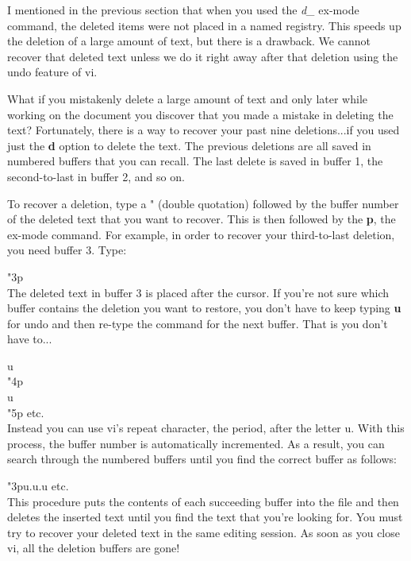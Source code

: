 I mentioned in the previous section that when you used the \emph{d\_} ex-mode command, the deleted items were not placed in a named registry. This speeds up the deletion of a large amount of text, but there is a drawback. We cannot recover that deleted text unless we do it right away after that deletion using the undo feature of vi.

What if you mistakenly delete a large amount of text and only later while working on the document you discover that you made a mistake in deleting the text? Fortunately, there is a way to recover your past nine deletions...if you used just the \textbf{d} option to delete the text. The previous deletions are all saved in numbered buffers that you can recall. The last delete is saved in buffer 1, the second-to-last in buffer 2, and so on.

To recover a deletion, type a " (double quotation) followed by the buffer number of the deleted text that you want to recover. This is then followed by the \textbf{p}, the ex-mode  command. For example, in order to recover your third-to-last deletion, you need buffer 3. Type:

"3p\\

The deleted text in buffer 3 is placed after the cursor. If you're not sure which buffer contains the deletion you want to restore, you don't have to keep typing \textbf{u} for undo and then re-type the command for the next buffer. That is you don't have to...

u\\
"4p \\
u\\
"5p etc.\\

Instead you can use vi's repeat character, the period, after the letter u. With this process, the buffer number is automatically incremented. As a result, you can search through the numbered buffers until you find the correct buffer as follows:

"3pu.u.u etc.\\

This procedure puts the contents of each succeeding buffer into the file and then deletes the inserted text until you find the text that you're looking for. You must try to recover your deleted text in the same editing session. As soon as you close vi, all the deletion buffers are gone!

